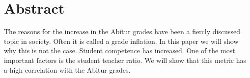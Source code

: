 \section*{Abstract}
The reasons for the increase in the Abitur grades have been a fiercly discussed topic in society. Often it is called a grade inflation. In this paper we will show why this is not the case. Student competence has increased. One of the most important factors is the student teacher ratio. We will show that this metric has a high correlation with the Abitur grades.
